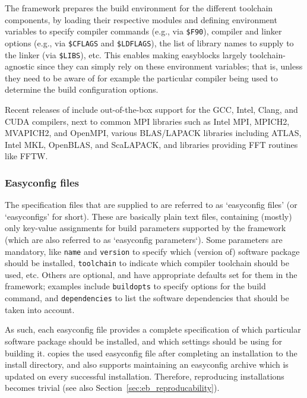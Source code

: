 The \easybuild{} framework prepares the build environment for the different
toolchain components, by loading their respective modules and defining environment
variables to specify compiler commands (e.g., via \texttt{\$F90}), compiler and
linker options (e.g., via \texttt{\$CFLAGS} and \texttt{\$LDFLAGS}), the list of
library names to supply to the linker (via \texttt{\$LIBS}), etc. This enables
making easyblocks largely toolchain-agnostic since they can simply rely on these
environment variables; that is, unless they need to be aware of for example the
particular compiler being used to determine the build configuration options.

Recent releases of \easybuild{} include out-of-the-box support for the GCC, Intel,
Clang, and CUDA compilers, next to common MPI libraries such as Intel MPI, MPICH2,
MVAPICH2, and OpenMPI, various BLAS/LAPACK libraries including ATLAS, Intel MKL,
OpenBLAS, and ScaLAPACK, and libraries providing FFT routines like FFTW.

\subsubsection{Easyconfig files}
\label{sec:eb_easyconfigs}

The specification files that are supplied to \easybuild{} are referred to as
`easyconfig files' (or `easyconfigs' for short). These are basically plain text
files, containing (mostly) only key-value assignments for build parameters supported
by the framework (which are also referred to as `easyconfig parameters`). Some
parameters are mandatory, like \texttt{name} and \texttt{version} to specify which
(version of) software package should be installed, \texttt{toolchain} to indicate
which compiler toolchain should be used, etc. Others are optional, and have
appropriate defaults set for them in the \easybuild{} framework; examples include
\texttt{buildopts} to specify options for the build command, and \texttt{dependencies}
to list the software dependencies that should be taken into account.

As such, each easyconfig file provides a complete specification of which particular
software package should be installed, and which settings should be using for building
it. \easybuild{} copies the used easyconfig file after completing an installation
to the install directory, and also supports maintaining an easyconfig archive which
is updated on every successful installation. Therefore, reproducing installations
becomes trivial (see also Section~\ref{sec:eb_reproducability}).


